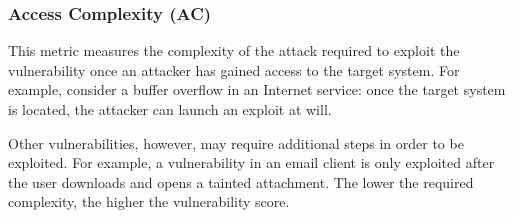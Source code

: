     \subsubsection{Access Complexity (AC)}\label{subsec:access-complexity-ac}

    This metric measures the complexity of the attack required to exploit
    the vulnerability once an attacker has gained access to the target
    system. For example, consider a buffer overflow in an Internet service:
    once the target system is located, the attacker can launch an exploit at
    will.

    Other vulnerabilities, however, may require additional steps in order to
    be exploited. For example, a vulnerability in an email client is only
    exploited after the user downloads and opens a tainted attachment. The
    lower the required complexity, the higher the vulnerability score.

